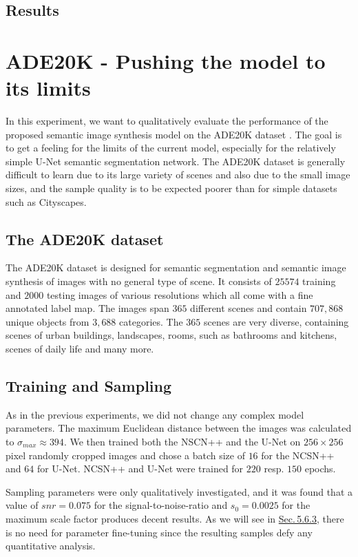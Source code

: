 \subsection{Results}

\section[ADE20K - Pushing the model to its limits]{ADE20K - Pushing the model to its limits%
    } \label{sec:5.6}
In this experiment, we want to qualitatively evaluate the performance of the proposed semantic image synthesis model on the ADE20K dataset \cite{ade20k}. The goal is to get a feeling for the limits of the current model, especially for the relatively simple U-Net semantic segmentation network. The ADE20K dataset is generally difficult to learn due to its large variety of scenes and also due to the small image sizes, and the sample quality is to be expected poorer than for simple datasets such as Cityscapes. 
%
\subsection{The ADE20K dataset}
The ADE20K dataset \cite{ade20k}  is designed for semantic segmentation and semantic image synthesis of images with no general type of scene. It consists of $25574$ training and $2000$ testing images of various resolutions which all come with a fine annotated label map. The images span $365$ different scenes and contain $707{,}868$ unique objects from $3{,}688$ categories. The $365$ scenes are very diverse, containing scenes of urban buildings, landscapes, rooms, such as bathrooms and kitchens, scenes of daily life and many more. 
%
\subsection{Training and Sampling}
As in the previous experiments, we did not change any complex model parameters. The maximum Euclidean distance between the images was calculated to $\sigma_{max}\approx394$. We then trained both the NSCN++ and the U-Net on $256\times256$ pixel randomly cropped images and chose a batch size of $16$ for the NCSN++ and $64$ for U-Net. NCSN++ and U-Net were trained for $220$ resp. $150$ epochs.

Sampling parameters were only qualitatively investigated, and it was found that a value of $snr=0.075$ for the signal-to-noise-ratio and $s_0=0.0025$ for the maximum scale factor produces decent results. As we will see in \hyperref[sec:5.6.3]{Sec.\,5.6.3}, there is no need for parameter fine-tuning since the resulting samples defy any quantitative analysis.

